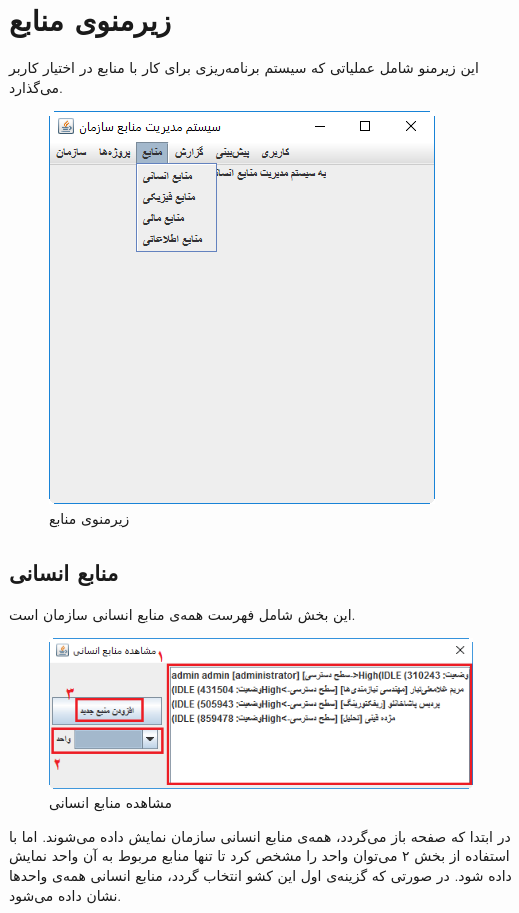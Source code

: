 \newpage
\section{زیرمنوی منابع}
این زیرمنو شامل عملیاتی که سیستم برنامه‌ریزی برای کار با منابع در اختیار کاربر می‌گذارد.

	\begin{figure}[H]
		\centering
		\includegraphics[scale=0.7]{img/manual/resSubmenu}
		\caption{زیرمنوی منابع}
	\end{figure}

\subsection{منابع انسانی}
این بخش شامل فهرست همه‌ی منابع انسانی سازمان است.
	\begin{figure}[H]
		\centering
		\includegraphics[scale=0.5]{img/manual/hRess}
		\caption{مشاهده منابع انسانی}
		\label{f10}
	\end{figure}

در ابتدا که صفحه باز می‌گردد، همه‌ی منابع انسانی سازمان نمایش داده می‌شوند. اما با استفاده از بخش ۲ می‌توان واحد را مشخص کرد تا تنها منابع مربوط به آن واحد نمایش داده شود. در صورتی که گزینه‌ی اول این کشو انتخاب گردد، منابع انسانی همه‌ی واحدها نشان داده می‌شود.
